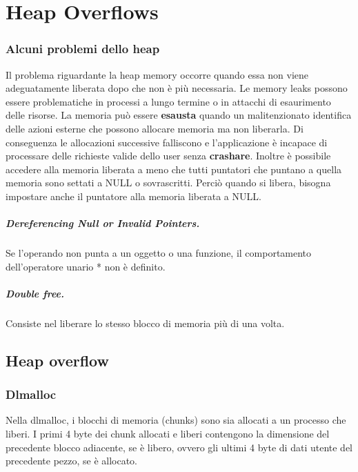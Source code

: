 \chapter{Heap Overflows}
\subsection{Alcuni problemi dello heap}
Il problema riguardante la heap memory occorre quando essa non viene adeguatamente liberata
dopo che non è più necessaria. Le memory leaks possono essere problematiche in processi a lungo termine
o in attacchi di esaurimento delle risorse. La memoria può essere \textbf{esausta} quando un malitenzionato identifica delle azioni esterne che possono allocare memoria ma non liberarla. Di conseguenza le allocazioni successive  falliscono e l'applicazione è incapace di processare delle richieste valide dello user senza \textbf{crashare}. Inoltre è possibile accedere alla memoria liberata a meno che tutti puntatori che puntano a quella memoria sono settati a NULL o sovrascritti. Perciò quando si libera, bisogna impostare anche il puntatore alla memoria liberata a NULL.

\paragraph{Dereferencing Null or Invalid Pointers.} Se l'operando non punta a un oggetto o una funzione, il comportamento dell'operatore unario * non è definito.

\paragraph{Double free.} Consiste nel liberare lo stesso blocco di memoria più di una volta.

\section{Heap overflow}
\subsection{Dlmalloc}
Nella dlmalloc, i blocchi di memoria (chunks) sono sia allocati a un processo che liberi. I primi 4 byte dei chunk allocati e liberi contengono la dimensione del precedente blocco adiacente, se è libero, ovvero gli ultimi 4 byte di dati utente del precedente pezzo, se è allocato.

